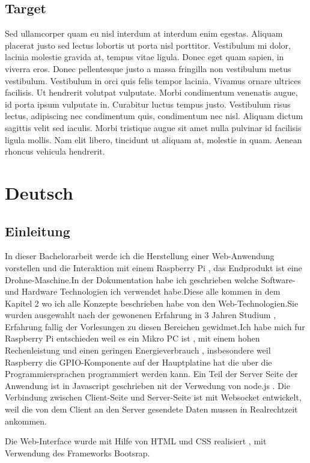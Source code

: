 \subsection{Target}
Sed ullamcorper quam eu nisl interdum at interdum enim egestas. Aliquam placerat justo sed lectus lobortis ut porta nisl porttitor. Vestibulum mi dolor, lacinia molestie gravida at, tempus vitae ligula. Donec eget quam sapien, in viverra eros. Donec pellentesque justo a massa fringilla non vestibulum metus vestibulum. Vestibulum in orci quis felis tempor lacinia. Vivamus ornare ultrices facilisis. Ut hendrerit volutpat vulputate. Morbi condimentum venenatis augue, id porta ipsum vulputate in. Curabitur luctus tempus justo. Vestibulum risus lectus, adipiscing nec condimentum quis, condimentum nec nisl. Aliquam dictum sagittis velit sed iaculis. Morbi tristique augue sit amet nulla pulvinar id facilisis ligula mollis. Nam elit libero, tincidunt ut aliquam at, molestie in quam. Aenean rhoncus vehicula hendrerit.
\section{Deutsch}

\subsection{Einleitung}
In dieser Bachelorarbeit werde ich die Herstellung einer Web-Anwendung vorstellen und die Interaktion mit einem Raspberry Pi , das Endprodukt ist eine Drohne-Maschine.In der Dokumentation habe ich geschrieben welche Software- und Hardware Technologien ich verwendet habe.Diese alle kommen in dem Kapitel 2 wo ich alle Konzepte beschrieben habe von den Web-Technologien.Sie wurden ausgewahlt nach der gewonenen Erfahrung in 3 Jahren Studium , Erfahrung fallig der Vorlesungen zu diesen Bereichen gewidmet.Ich habe mich fur Raspberry Pi entschieden weil es ein Mikro PC ist , mit einem hohen Rechenleistung und einen geringen Energieverbrauch , insbesondere weil Raspberry die GPIO-Komponente auf der Hauptplatine hat die uber die Programmiersprachen programmiert werden kann. Ein Teil der Server Seite der Anwendung ist in Javascript geschrieben nit der Verwedung von node.js . Die Verbindung zwischen Client-Seite und Server-Seite ist mit Websocket  entwickelt, weil die von dem Client an den Server gesendete Daten mussen in Realrechtzeit ankommen.

Die Web-Interface wurde mit Hilfe von HTML und CSS realisiert , mit Verwendung des Frameworks Bootsrap.


